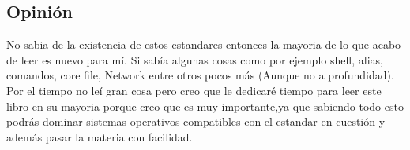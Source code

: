 \documentclass[11pt, a4paper]{report}
\begin{document}
\subsection*{Opini\'on}

No sabia de la existencia de estos estandares entonces la mayoria de lo que acabo de leer es nuevo
para m\'i. Si sab\'ia algunas cosas como por ejemplo shell, alias, comandos, core file, Network entre
otros pocos m\'as (Aunque no a profundidad). Por el tiempo no le\'i gran cosa pero creo que le dedicar\'e
tiempo para leer este libro en su mayoria porque creo que es muy importante,ya que sabiendo todo esto podr\'as dominar 
sistemas operativos compatibles con el estandar en cuesti\'on y adem\'as pasar la materia con facilidad.
\end{document}
